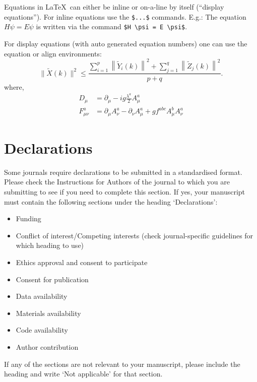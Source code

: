 \documentclass[sn-mathphys-num]{sn-jnl}%
\theoremstyle{thmstyleone}%
\theoremstyle{thmstyletwo}%
\theoremstyle{thmstylethree}%
\begin{document}
Equations in \LaTeX\ can either be inline or on-a-line by itself (``display equations''). For
inline equations use the \verb+$...$+ commands. E.g.: The equation
$H\psi = E \psi$ is written via the command \verb+$H \psi = E \psi$+.

For display equations (with auto generated equation numbers)
one can use the equation or align environments:
\begin{equation}
    \|\tilde{X}(k)\|^2 \leq\frac{\sum\limits_{i=1}^{p}\left\|\tilde{Y}_i(k)\right\|^2+\sum\limits_{j=1}^{q}\left\|\tilde{Z}_j(k)\right\|^2 }{p+q}.\label{eq1}
\end{equation}
where,
\begin{align}
    D_\mu        & =  \partial_\mu - ig \frac{\lambda^a}{2} A^a_\mu \nonumber                            \\
    F^a_{\mu\nu} & = \partial_\mu A^a_\nu - \partial_\nu A^a_\mu + g f^{abc} A^b_\mu A^a_\nu \label{eq2}
\end{align}

\section*{Declarations}

Some journals require declarations to be submitted in a standardised format. Please check the Instructions for Authors of the journal to which you are submitting to see if you need to complete this section. If yes, your manuscript must contain the following sections under the heading `Declarations':

\begin{itemize}
    \item Funding
    \item Conflict of interest/Competing interests (check journal-specific guidelines for which heading to use)
    \item Ethics approval and consent to participate
    \item Consent for publication
    \item Data availability
    \item Materials availability
    \item Code availability
    \item Author contribution
\end{itemize}

\noindent
If any of the sections are not relevant to your manuscript, please include the heading and write `Not applicable' for that section.
\end{document}
